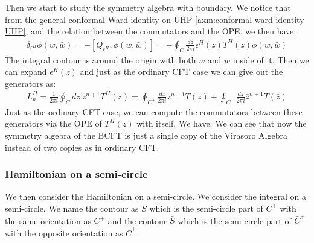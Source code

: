 Then we start to study the symmetry algebra with boundary. We notice
that from the general conformal Ward identity on UHP
\cref{axm:conformal ward identity UHP}, and the relation between the
commutators and the OPE, we then have:
\begin{align}\label{eq:generatorwithboundary}
  \delta_{\epsilon^H} \phi(w,\bar{w}) = - [Q_{\epsilon^H},
  \phi(w,\bar{w})] =- \oint_{C} \frac{dz}{2\pi i} \epsilon^H(z)
  T^H(z) \phi(w,\bar{w})
\end{align}
The integral contour is around the origin with both $ w $ and $
\bar{w} $ inside of it. Then we can expand $ \epsilon^H(z) $ and just
as the ordinary CFT case we can give out the generators as:
\begin{align}
  L_n^H = \frac{1}{2\pi i} \oint_{C} dz \ z^{n+1} T^H(z) =
  \oint_{C^+} \frac{dz}{2\pi i} z^{n+1} T(z) + \oint_{\bar{C}^+}
  \frac{d\bar{z}}{2\pi i} \bar{z}^{n+1} \bar{T}(\bar{z})
\end{align}
Just as the ordinary CFT case, we can compute the commutators between
these generators via the OPE of $ T^H(z) $ with itself. We have:
We can see that now the symmetry algebra of the BCFT is just a single
copy of the Virasoro Algebra instead of two copies as in ordinary CFT.

\subsubsection{Hamiltonian on a semi-circle}
We then consider the Hamiltonian on a semi-circle. We consider the
integral on a semi-circle. We name the contour as $ S $ which is the
semi-circle part of $ C^+ $ with the same orientation as $ C^+ $ and
the contour $ \bar{S} $ which is the semi-circle part of $ \bar{C}^+
$ with the opposite orientation as $ \bar{C}^+ $.

